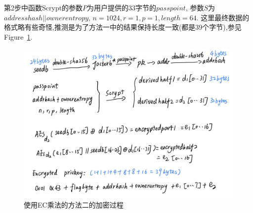 第2步中函数Scrypt的参数$P$为用户提供的33字节的$passpoint$, 
参数$S$为$addresshash || ownerentropy$, $n=1024, r=1, p=1, length=64$.
这里最终数据的格式略有些奇怪,推测是为了方法一中的结果保持长度一致(都是39个字节),参见Figure~\ref{fig-m2enc}.




\begin{figure}[h]
\centering
\includegraphics[width=.7\textwidth]{./ec.png}
\caption{使用EC乘法的方法二的加密过程}\label{fig-m2enc}
\end{figure}

